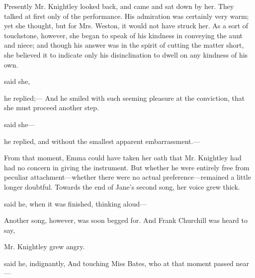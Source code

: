 Presently Mr. Knightley looked back, and came and sat down by her. They talked at first only of the performance. His admiration was certainly very warm; yet she thought, but for Mrs. Weston, it would not have struck her. As a sort of touchstone, however, she began to speak of his kindness in conveying the aunt and niece; and though his answer was in the spirit of cutting the matter short, she believed it to indicate only his disinclination to dwell on any kindness of his own.

 said she, 

 he replied;--- And he smiled with such seeming pleasure at the conviction, that she must proceed another step.

 said she---

 he replied, and without the smallest apparent embarrassment.---

From that moment, Emma could have taken her oath that Mr. Knightley had had no concern in giving the instrument. But whether he were entirely free from peculiar attachment---whether there were no actual preference---remained a little longer doubtful. Towards the end of Jane's second song, her voice grew thick.

 said he, when it was finished, thinking aloud---

Another song, however, was soon begged for.  And Frank Churchill was heard to say, 

Mr. Knightley grew angry.

 said he, indignantly,  And touching Miss Bates, who at that moment passed near---

